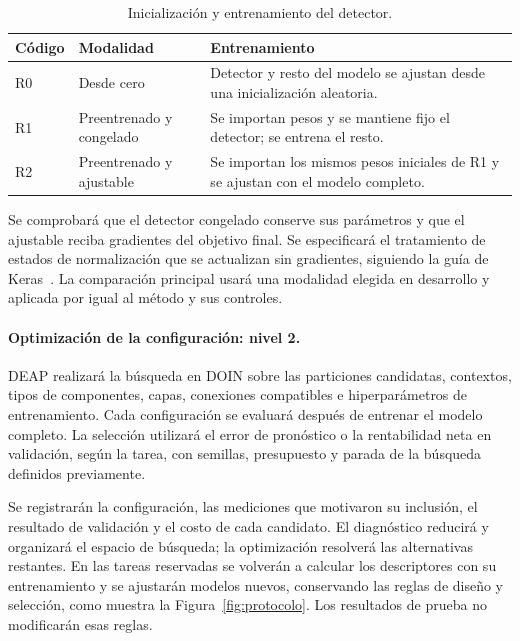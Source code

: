 \documentclass[11pt,letterpaper]{article}
\begin{document}
\begin{table}[H]
  \centering\small
  \caption{Inicialización y entrenamiento del detector.}
  \label{tab:regimenes}
  \begin{tabularx}{\textwidth}{@{}L{1.1cm}L{3.6cm}Y@{}}
  \toprule
  \textbf{Código} & \textbf{Modalidad} & \textbf{Entrenamiento} \\
  \midrule
  R0 & Desde cero & Detector y resto del modelo se ajustan desde una inicialización aleatoria. \\
  R1 & Preentrenado y congelado & Se importan pesos y se mantiene fijo el detector; se entrena el resto. \\
  R2 & Preentrenado y ajustable & Se importan los mismos pesos iniciales de R1 y se ajustan con el modelo completo. \\
  \bottomrule
  \end{tabularx}
\end{table}

Se comprobará que el detector congelado conserve sus parámetros y que el ajustable reciba gradientes del objetivo final. Se especificará el tratamiento de estados de normalización que se actualizan sin gradientes, siguiendo la guía de Keras~\cite{keras2023transfer}. La comparación principal usará una modalidad elegida en desarrollo y aplicada por igual al método y sus controles.

\paragraph{Optimización de la configuración: nivel 2.}
DEAP realizará la búsqueda en DOIN sobre las particiones candidatas, contextos, tipos de componentes, capas, conexiones compatibles e hiperparámetros de entrenamiento. Cada configuración se evaluará después de entrenar el modelo completo. La selección utilizará el error de pronóstico o la rentabilidad neta en validación, según la tarea, con semillas, presupuesto y parada de la búsqueda definidos previamente.

Se registrarán la configuración, las mediciones que motivaron su inclusión, el resultado de validación y el costo de cada candidato. El diagnóstico reducirá y organizará el espacio de búsqueda; la optimización resolverá las alternativas restantes. En las tareas reservadas se volverán a calcular los descriptores con su entrenamiento y se ajustarán modelos nuevos, conservando las reglas de diseño y selección, como muestra la Figura~\ref{fig:protocolo}. Los resultados de prueba no modificarán esas reglas.
\end{document}
